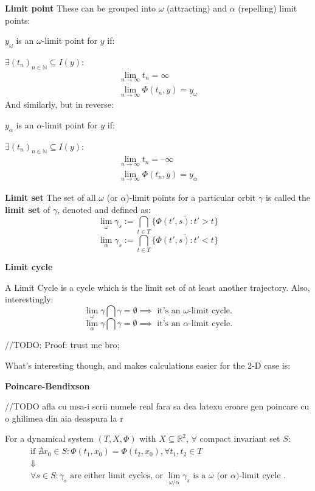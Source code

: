 \begin{definition}\textbf{Limit point}
  These can be grouped into $\omega$ (attracting) and $\alpha$ (repelling) limit points:

  $y_\omega$ is an $\omega$-limit point  for $y$ if:

  $\exists (t_n)_{n \in \mathbb{N}} \subseteq I(y) : $
  \begin{gather*}
    \lim_{n \rightarrow \infty} t_n = \infty  \\
    \lim_{n \rightarrow \infty} \Phi(t_n,y) = y_\omega
  \end{gather*}
  And similarly, but in reverse:

  $y_\alpha$ is an $\alpha$-limit point  for $y$ if:

  $\exists (t_n)_{n \in \mathbb{N}} \subseteq I(y) : $
  \begin{gather*}
    \lim_{n \rightarrow \infty} t_n = \textbf{--} \infty  \\
    \lim_{n \rightarrow \infty} \Phi(t_n,y) = y_\alpha
  \end{gather*}
\end{definition}

\begin{definition}\textbf{Limit set}
  The set of all $\omega$ (or $\alpha$)-limit points for a particular orbit $\gamma$ is called the \textbf{limit set} of $\gamma$, denoted and defined as:
  \[
    \lim_{\omega}\gamma_s := \bigcap_{t \in T} \overline{ \{ \Phi(t', s) : t' > t \} }
  \]
  \[
    \lim_{\alpha}\gamma_s := \bigcap_{t \in T} \overline{ \{ \Phi(t', s) : t' < t \} }
  \]
\end{definition}

\begin{definition} \textbf{Limit cycle}

  A Limit Cycle is a cycle which is the limit set of at least another trajectory.
  Also, interestingly:
  \[
    \lim_{\omega}\gamma \bigcap \gamma  = \emptyset \implies \text{ it's an } \omega \text{-limit cycle}.
  \]
  \[
    \lim_{\alpha}\gamma \bigcap \gamma  = \emptyset \implies \text{ it's an } \alpha \text{-limit cycle}.
  \]
\end{definition}

//TODO: Proof: trust me bro;

What's interesting though, and makes calculations easier for the 2-D case is:
\begin{theorem}  \textbf{Poincare-Bendixson}

  //TODO afla cu msa-i scrii numele real fara sa dea latexu eroare gen poincare cu o ghilimea din aia deaspura la r

  For a dynamical system $(T,X,\Phi)$ with $X \subseteq \mathbb{R}^2$, $\forall$ compact invariant set $S$:
  \begin{gather*}
    \text{if } \nexists x_0 \in S : \Phi(t_1, x_0) = \Phi(t_2,x_0), \forall t_1,t_2 \in T \\
    \Downarrow \\
    \forall s \in S: \gamma_s \text{ are either limit cycles, or } \lim_{\omega / \alpha}\gamma_s \text{ is a $\omega$ (or $\alpha$)-limit cycle }.
  \end{gather*}
\end{theorem}

